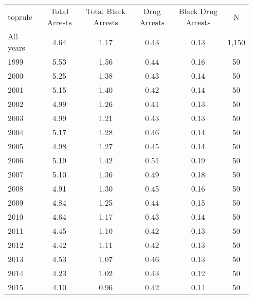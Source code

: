 \begin{center}
\begin{tabular}{l c c c c c}
toprule
& Total Arrests & Total Black Arrests & Drug Arrests & Black Drug Arrests & N \\
\cline{2-6}
\hspace{10pt} All years & 4.64 & 1.17 & 0.43 & 0.13 & 1,150 \\
\hspace{10pt} 1999 & 5.53 & 1.56 & 0.44 & 0.16 & 50 \\
\hspace{10pt} 2000 & 5.25 & 1.38 & 0.43 & 0.14 & 50 \\
\hspace{10pt} 2001 & 5.15 & 1.40 & 0.42 & 0.14 & 50 \\
\hspace{10pt} 2002 & 4.99 & 1.26 & 0.41 & 0.13 & 50 \\
\hspace{10pt} 2003 & 4.99 & 1.21 & 0.43 & 0.13 & 50 \\
\hspace{10pt} 2004 & 5.17 & 1.28 & 0.46 & 0.14 & 50 \\
\hspace{10pt} 2005 & 4.98 & 1.27 & 0.45 & 0.14 & 50 \\
\hspace{10pt} 2006 & 5.19 & 1.42 & 0.51 & 0.19 & 50 \\
\hspace{10pt} 2007 & 5.10 & 1.36 & 0.49 & 0.18 & 50 \\
\hspace{10pt} 2008 & 4.91 & 1.30 & 0.45 & 0.16 & 50 \\
\hspace{10pt} 2009 & 4.84 & 1.25 & 0.44 & 0.15 & 50 \\
\hspace{10pt} 2010 & 4.64 & 1.17 & 0.43 & 0.14 & 50 \\
\hspace{10pt} 2011 & 4.45 & 1.10 & 0.42 & 0.13 & 50 \\
\hspace{10pt} 2012 & 4.42 & 1.11 & 0.42 & 0.13 & 50 \\
\hspace{10pt} 2013 & 4.53 & 1.07 & 0.46 & 0.13 & 50 \\
\hspace{10pt} 2014 & 4.23 & 1.02 & 0.43 & 0.12 & 50 \\
\hspace{10pt} 2015 & 4.10 & 0.96 & 0.42 & 0.11 & 50 \\

\end{tabular}
\end{center}
